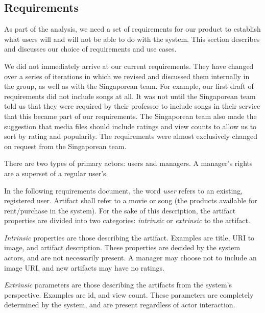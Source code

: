 \subsection{Requirements}
\label{sec:requirements}
As part of the analysis, we need a set of requirements for our product to
establish what users will and will not be able to do with the system. This
section describes and discusses our choice of requirements and use cases.

We did not immediately arrive at our current requirements. They have changed
over a series of iterations in which we revised and discussed them internally
in the group, as well as with the Singaporean team. For example, our first
draft of requirements did not include songs at all. It was not until the
Singaporean team told us that they were required by their professor to include
songs in their service that this became part of our requirements. The
Singaporean team also made the suggestion that media files should include
ratings and view counts to allow us to sort by rating and popularity. The
requirements were almost exclusively changed on request from the Singaporean
team.

There are two types of primary actors: users and managers. A manager’s rights
are a superset of a regular user's.

In the following requirements document, the word \emph{user} refers to an
existing, registered user. Artifact shall refer to a movie or song (the
products available for rent/purchase in the system). For the sake of this
description, the artifact properties are divided into two categories:
\emph{intrinsic} or \emph{extrinsic} to the artifact.

\emph{Intrinsic}
properties are those describing the artifact. Examples are title, URI to image,
and artifact description. These properties are decided by the system actors,
and are not necessarily present. A manager may choose not to include an image
URI, and new artifacts may have no ratings.

\emph{Extrinsic} parameters are those
describing the artifacts from the system's perspective. Examples are id, and
view count. These parameters are completely determined by the system, and are
present regardless of actor interaction.

